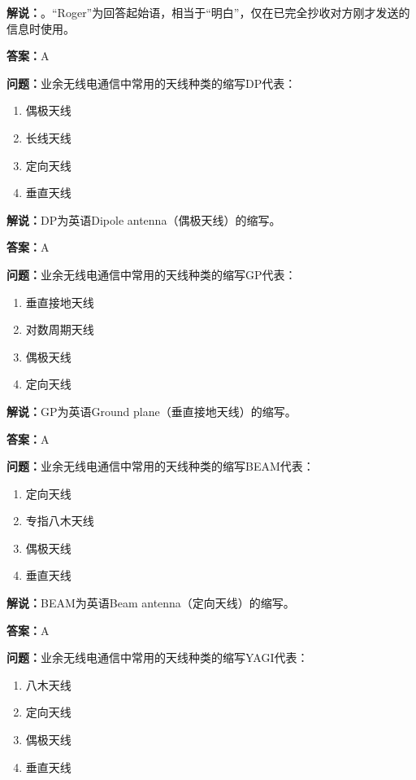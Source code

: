 \textbf{解说：}。“Roger”为回答起始语，相当于“明白”，仅在已完全抄收对方刚才发送的信息时使用。

\textbf{答案：}A

\textbf{问题：}业余无线电通信中常用的天线种类的缩写DP代表：

\begin{enumerate}[label=\Alph*), leftmargin=1cm]
	\item 偶极天线
	\item 长线天线
	\item 定向天线
	\item 垂直天线
\end{enumerate}

\textbf{解说：}DP为英语Dipole antenna（偶极天线）的缩写。

\textbf{答案：}A

\textbf{问题：}业余无线电通信中常用的天线种类的缩写GP代表：

\begin{enumerate}[label=\Alph*), leftmargin=1cm]
	\item 垂直接地天线
	\item 对数周期天线
	\item 偶极天线
	\item 定向天线
\end{enumerate}

\textbf{解说：}GP为英语Ground plane（垂直接地天线）的缩写。

\textbf{答案：}A

\textbf{问题：}业余无线电通信中常用的天线种类的缩写BEAM代表：

\begin{enumerate}[label=\Alph*), leftmargin=1cm]
	\item 定向天线
	\item 专指八木天线
	\item 偶极天线
	\item 垂直天线
\end{enumerate}

\textbf{解说：}BEAM为英语Beam antenna（定向天线）的缩写。

\textbf{答案：}A

\textbf{问题：}业余无线电通信中常用的天线种类的缩写YAGI代表：

\begin{enumerate}[label=\Alph*), leftmargin=1cm]
	\item 八木天线
	\item 定向天线
	\item 偶极天线
	\item 垂直天线
\end{enumerate}

